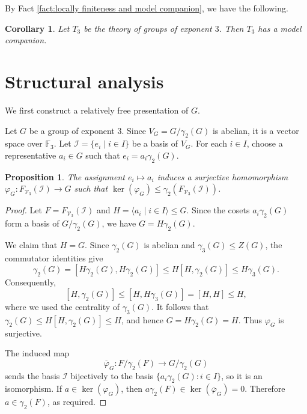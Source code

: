 \documentclass[11pt,reqno]{article}
\newtheorem{proposition}[theorem]{Proposition}
\newtheorem{corollary}[theorem]{Corollary}
\theoremstyle{definition}
\theoremstyle{remark}
\begin{document}
By Fact \ref{fact:locally finiteness and model companion}, we have the following.
\begin{corollary}
    Let $T_3$ be the theory of groups of exponent $3$. Then $T_3$ has a model companion.
\end{corollary}


\section{Structural analysis}
\label{sec:structure}

We first construct a relatively free presentation of $G$.

Let $G$ be a group of exponent $3$.
Since $V_G=G/\gamma_2(G)$ is abelian, it is a vector space over $\mathbb F_3$.
Let $\mathcal I=\{e_i\mid i\in I\}$ be a basis of $V_G$.  For each $i\in I$,
choose a representative $a_i\in G$ such that
$e_i=a_i\gamma_2(G)$.

\begin{proposition}\label{proposition:lift}
    The assignment $e_i\mapsto a_i$ induces a surjective homomorphism
    $\varphi_G:F_{\mathcal V_3}(\mathcal I)\to G$ such that
    $\ker(\varphi_G)\leq\gamma_2(F_{\mathcal V_3}(\mathcal I))$.
\end{proposition}

\begin{proof}
    Let $F=F_{\mathcal V_3}(\mathcal I)$ and
    $H=\langle a_i\mid i\in I\rangle\leq G$.  Since the cosets
    $a_i\gamma_2(G)$ form a basis of $G/\gamma_2(G)$, we have
    $G=H\gamma_2(G)$.

    We claim that $H=G$.  Since $\gamma_2(G)$ is abelian and
    $\gamma_3(G)\leq Z(G)$, the commutator identities give
    \[
    \gamma_2(G)
    =[H\gamma_2(G),H\gamma_2(G)]
    \leq H[H,\gamma_2(G)]
    \leq H\gamma_3(G).
    \]
    Consequently,
    \[
    [H,\gamma_2(G)]
    \leq[H,H\gamma_3(G)]
    =[H,H]
    \leq H,
    \]
    where we used the centrality of $\gamma_3(G)$.  It follows that
    $\gamma_2(G)\leq H[H,\gamma_2(G)]\leq H$, and hence
    $G=H\gamma_2(G)=H$.  Thus $\varphi_G$ is surjective.

    The induced map
    \[
    \overline{\varphi}_G:F/\gamma_2(F)\longrightarrow G/\gamma_2(G)
    \]
    sends the basis $\mathcal I$ bijectively to the basis
    $\{a_i\gamma_2(G):i\in I\}$, so it is an isomorphism.  If
    $a\in\ker(\varphi_G)$, then
    $a\gamma_2(F)\in\ker(\overline{\varphi}_G)=0$.  Therefore
    $a\in\gamma_2(F)$, as required.
\end{proof}
\end{document}
